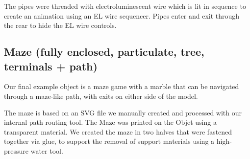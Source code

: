 The pipes were threaded with electroluminescent wire which is lit in sequence to create an animation using an EL wire sequencer. Pipes enter and exit through the rear to hide the EL wire controls.  

\subsection{Maze (fully enclosed, particulate, tree, terminals + path)}

Our final example object is a maze game with a marble that can be navigated through a maze-like path, with exits on either side of the model. 

The maze is based on an SVG file we manually created and processed with our internal path routing tool.  The Maze was printed on the Objet using a transparent material. We created the maze in two halves that were fastened together via glue, to support the removal of support materials using a high-pressure water tool.  